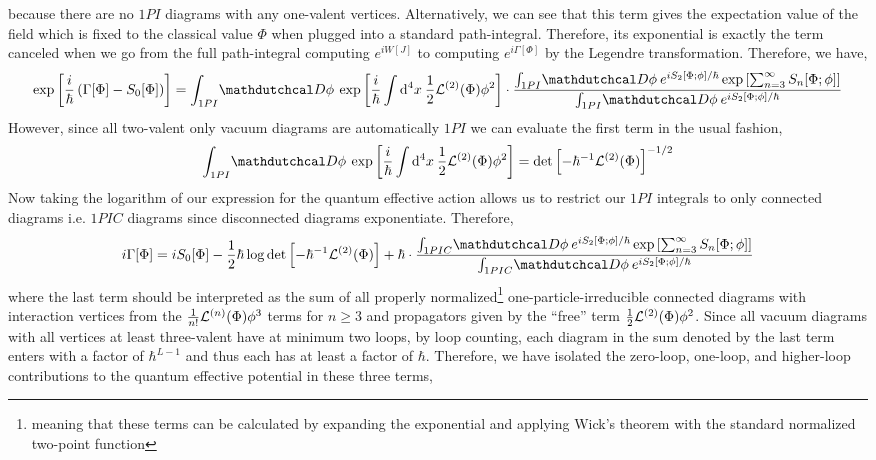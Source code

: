 \documentclass[12pt]{article}
\begin{document}
because there are no $1PI$ diagrams with any one-valent vertices. Alternatively, we can see that this term gives the expectation value of the field which is fixed to the classical value $\Phi$ when plugged into a standard path-integral. Therefore, its exponential is exactly the term canceled when we go from the full path-integral computing $e^{i W[J]}$ to computing $e^{i \Gamma[\Phi]}$ by the Legendre transformation. Therefore, we have,
\begin{align*}
\exp{\left[ \frac{i}{\hbar} \left( \Gamma[\Phi] - S_0[\Phi] \right) \right]} = \int_{1PI} \pathd{\phi} \exp{\left[ \frac{i}{\hbar} \int \dn{4}{x} \frac{1}{2} \lagrange^{(2)}(\Phi) \phi^2 \right]} \cdot \frac{\int_{1PI} \pathd{\phi} e^{i S_2[\Phi ; \phi] / \hbar} \exp{\left[ \sum_{n = 3}^{\infty} S_n[\Phi ; \phi] \right]}}{\int_{1PI} \pathd{\phi} e^{i S_2[\Phi ; \phi] / \hbar}}
\end{align*}
However, since all two-valent only vacuum diagrams are automatically $1PI$ we can evaluate the first term in the usual fashion,
\[ \int_{1PI} \pathd{\phi} \exp{\left[ \frac{i}{\hbar} \int \dn{4}{x} \frac{1}{2} \lagrange^{(2)}(\Phi) \phi^2 \right]} = \det{\left[ - \hbar^{-1} \lagrange^{(2)}(\Phi) \right]^{-1/2}} \]
Now taking the logarithm of our expression for the quantum effective action allows us to restrict our $1PI$ integrals to only connected diagrams i.e. $1PIC$ diagrams since disconnected diagrams exponentiate. Therefore,
\[ i \Gamma[\Phi] = i S_0[\Phi] - \frac{1}{2} \hbar \log{\det{\left[ - \hbar^{-1} \lagrange^{(2)}(\Phi) \right]}} + \hbar \cdot \frac{\int_{1PIC} \pathd{\phi} e^{i S_2[\Phi ; \phi] / \hbar} \exp{\left[ \sum_{n = 3}^{\infty} S_n[\Phi ; \phi] \right]}}{\int_{1PIC} \pathd{\phi} e^{i S_2[\Phi ; \phi] / \hbar}} \]
where the last term should be interpreted as the sum of all properly normalized\footnote{meaning that these terms can be calculated by expanding the exponential and applying Wick's theorem with the standard normalized two-point function} one-particle-irreducible connected diagrams with interaction vertices from the $\frac{1}{n!} \mathcal{L}^{(n)}(\Phi) \phi^3$ terms for $n \ge 3$ and propagators given by the ``free'' term $\frac{1}{2} \mathcal{L}^{(2)}(\Phi) \phi^2$. Since all vacuum diagrams with all vertices at least three-valent have at minimum two loops, by loop counting, each diagram in the sum denoted by the last term enters with a factor of $\hbar^{L-1}$ and thus each has at least a factor of $\hbar$. Therefore, we have isolated the zero-loop, one-loop, and higher-loop contributions to the quantum effective potential in these three terms,
\end{document}
